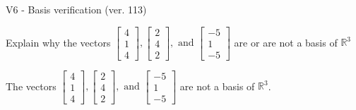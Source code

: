 \begin{exercise}
  \begin{exerciseTitle}V6 - Basis verification (ver. 113)\end{exerciseTitle}
  \begin{exerciseStatement}
    Explain why the vectors \(\left[\begin{array}{r}
4 \\
1 \\
4
\end{array}\right] , \left[\begin{array}{r}
2 \\
4 \\
2
\end{array}\right] , \text{ and } \left[\begin{array}{r}
-5 \\
1 \\
-5
\end{array}\right]\) are or are not a basis of \(\mathbb{R}^3\)	


  \end{exerciseStatement}
  \begin{exerciseAnswer}
   The vectors \(\left[\begin{array}{r}
4 \\
1 \\
4
\end{array}\right] , \left[\begin{array}{r}
2 \\
4 \\
2
\end{array}\right] , \text{ and } \left[\begin{array}{r}
-5 \\
1 \\
-5
\end{array}\right]\) 
  	 are not  a basis of \(\mathbb{R}^3\).
  


  \end{exerciseAnswer}
\end{exercise}